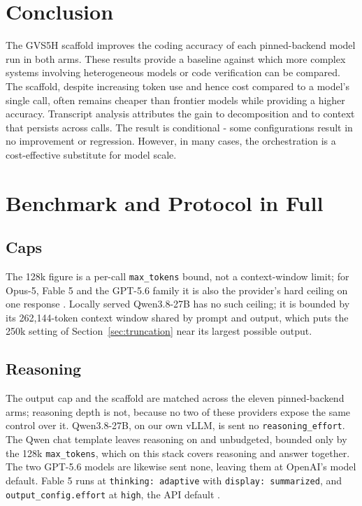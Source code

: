 \documentclass[journal]{IEEEtran}
\begin{document}
\section{Conclusion}
\label{sec:conclusion}

The GVS5H scaffold improves the coding accuracy of each pinned-backend model run in both arms. These results provide a baseline against which more complex systems involving heterogeneous models or code verification can be compared.
The scaffold, despite increasing token use and hence cost compared to a model's single call, often remains
cheaper than frontier models while providing a higher accuracy. Transcript analysis
attributes the gain to decomposition and to context that persists across calls.   The result is conditional - some configurations result in no improvement or regression. However, in many cases, the orchestration is a cost-effective substitute for model scale.


\appendices

\section{Benchmark and Protocol in Full}
\label{app:protocol}

\subsection{Caps} The 128k figure is a per-call \texttt{max\_tokens} bound, not a context-window
limit; for Opus-5, Fable 5 and the GPT-5.6 family it is also the provider's hard ceiling on one
response \cite{anthropic2026,openai2026}. Locally served Qwen3.8-27B has no such ceiling; it is
bounded by its 262{,}144-token context window \cite{qwen2026c} shared by prompt and output,
which puts the 250k setting of Section~\ref{sec:truncation} near its largest possible output.

\subsection{Reasoning} The output cap and the scaffold are matched across the eleven pinned-backend
arms; reasoning depth is not, because no two of these providers expose the same control over it.
Qwen3.8-27B, on our own vLLM, is sent no \texttt{reasoning\_effort}. The Qwen chat template
leaves reasoning on and unbudgeted, bounded only by the 128k \texttt{max\_tokens}, which on this
stack covers reasoning and answer together. The two GPT-5.6 models are likewise sent none, leaving
them at OpenAI's model default. Fable 5 runs at \texttt{thinking: adaptive} with \texttt{display:
summarized}, and \texttt{output\_config.effort} at \texttt{high}, the API default
\cite{anthropic2026effort}.
\end{document}
